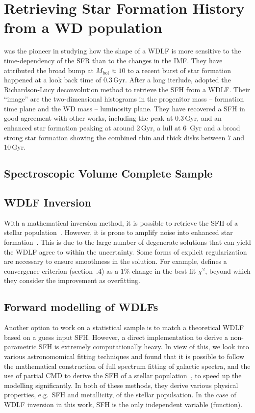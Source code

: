 \documentclass[fleqn,usenatbib]{mnras}
\begin{document}
\section{Retrieving Star Formation History from a WD population}
\citet{1990ApJ...352..605N} was the pioneer in studying how the shape of
a WDLF is more sensitive to the time-dependency of the SFR than to the changes
in the IMF. They have attributed the broad bump at $M_{\mathrm{bol}} \approx 10$
to a recent burst of star formation happened at a look back time of 0.3\,Gyr.
After a long iterlude, \citet{2013MNRAS.434.1549R} adopted the Richardson-Lucy
deconvolution method to retrieve the SFH from a WDLF. Their ``image'' are the
two-dimensional histograms in the progenitor mass -- formation time plane and 
the WD mass -- luminosity plane. They have recovered a SFH in good agreement 
with other works, including the peak at 0.3\,Gyr, and an enhanced star 
formation peaking at around 2\,Gyr, a lull at 6 \,Gyr and a broad strong star 
formation showing the combined thin and thick disks between 7 and 10\,Gyr.

\subsection{Spectroscopic Volume Complete Sample}

\citep{2014ApJ...791...92T}
\citep{2019ApJ...878L..11I}


\subsection{WDLF Inversion}
With a mathematical inversion method, it is possible to retrieve the SFH of a
stellar population~\citep{2013MNRAS.434.1549R}. However, it is prone to amplify
noise into enhanced star formation~\citep{2014ApJ...791...92T}. This is due to
the large number of degenerate solutions that can yield the WDLF agree to
within the uncertainty. Some forms of explicit regularization are necessary
to ensure smoothness in the solution. For example, \citet{2013MNRAS.434.1549R}
defines a convergence criterion (section~.4)
as a $1\%$ change in the best fit $\chi^2$, beyond which they consider the
improvement as overfitting.

\subsection{Forward modelling of WDLFs}
Another option to work on a statistical sample is to match a theoretical
WDLF based on a guess input SFH. However, a direct implementation to
derive a non-parametric SFH is extremely computationally heavy. In view of
this, we look into various astronomomical fitting techniques and found that
it is possible to follow the mathematical construction of full spectrum
fitting of galactic spectra, and the use of partial CMD to derive the SFH
of a stellar population~\citep{2006A&A...459..783C}, to speed up the
modelling significantly. In both of these methods, they derive various
physical properties, e.g.\ SFH and metallicity, of the stellar populsation.
In the case of WDLF inversion in this
work, SFH is the only independent variable (function).
\end{document}
